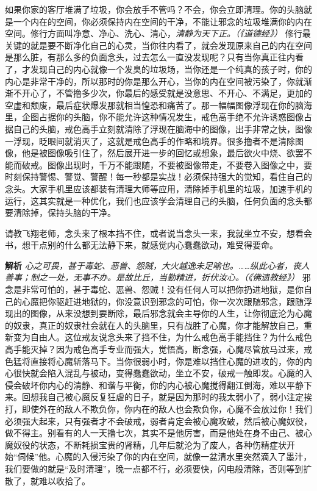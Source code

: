 如果你家的客厅堆满了垃圾，你会放手不管吗？不会，你会立即清理。你的头脑就是一个内在的空间，你必须保持内在空间的干净，不能让邪念的垃圾堆满你的内在空间。修行方面叫净意、净心、洗心、清心，\textit{清静为天下正。（《道德经》）} 修行最关键的就是要不断净化自己的心灵，当你往内看了，就会发现原来自己的内在空间是那么脏，有那么多的负面念头，过去怎么一直没发现呢？只有当你真正往内看了，才发现自己的内心就像一个发臭的垃圾场，当你还是一个纯真的孩子时，你的内心是非常干净的，所以那时的你是那么开心，当你的内在空间被污染了，你就渐渐不开心了，不管撸多少次，你最后的感受就是没意思、不开心、不满足，更加的空虚和颓废，最后症状爆发那就相当惶恐和痛苦了。那一幅幅图像浮现在你的脑海里，企图占据你的头脑，你不能允许这种情况发生，戒色高手绝不允许诱惑图像占据自己的头脑，戒色高手立刻就清除了浮现在脑海中的图像，出手非常之快，图像一浮现，眨眼间就消灭了，这就是戒色高手的作略和境界。很多撸者不是清除图像，他是被图像吸引住了，然后展开进一步的回忆或想象，最后欲火中烧、欲罢不能而破戒。图像出现时，千万不能跟随，不要被图像带走，不要卷入图像之中，要时刻保持警惕、警觉、警醒！每一秒都是实战！必须保持强大的觉知，看住自己的念头。大家手机里应该都装有清理大师等应用，清除掉手机里的垃圾，加速手机的运行，这其实就是一种优化，我们也应该学会清理自己的头脑，任何负面的念头都要清除掉，保持头脑的干净。

\begin{case}
    请教飞翔老师，念头来了根本挡不住，或者说当念头一来，我就坐立不安，想看会书，想干点别的什么都无法静下来，就感觉内心蠢蠢欲动，难受得要命。

    \textbf{解析} \textit{心之可畏，甚于毒蛇、恶兽、怨贼，大火越逸未足喻也。……纵此心者，丧人善事；制之一处，无事不办。是故比丘，当勤精进，折伏汝心。（《佛遗教经》）} 邪念是非常可怕的，甚于毒蛇、恶兽、怨贼！没有任何人可以把你扔进地狱，是你自己的心魔把你驱赶进地狱的，你没意识到邪念的可怕，你一次次跟随邪念，跟随浮现出的图像，从来没想到要断除，最后邪念就会主导你的人生，让你彻底沦为心魔的奴隶，真正的奴隶社会就在人的头脑里，只有战胜了心魔，你才能解放自己，重新变为自由人。这位戒友说念头来了挡不住，为什么戒色高手能挡住？为什么戒色高手能灭掉？因为戒色高手专业而强大，觉悟高，断念强，心魔尽管放马过来，戒色猛将直接将心魔斩落马下。当你很弱小时，你是难以挡住心魔的进攻的，你的内心很快就会陷入混乱与被动，变得蠢蠢欲动，坐立不安，破戒一触即发。心魔的入侵会破坏你内心的清静、和谐与平衡，你的内心被心魔搅得翻江倒海，难以平静下来。回想我自己被心魔反复狂虐的日子，就是因为那时的我太弱小了，弱小注定挨打，即使外在的敌人不欺负你，你内在的敌人也会欺负你，心魔不会放过你！我们必须强大起来，只有强者才不会破戒，弱者肯定会被心魔攻破，然后被心魔奴役，做不得主。别看有的人一天撸七次，其实不是他厉害，而是他处在身不由己、被心魔奴役的状态，不断耗损宝贵的肾精，几年后就沦为了废人，各种伤精症状开始“伺候”他。心魔的入侵污染了你的内在空间，就像一盆清水里突然滴入了墨汁，我们要做的就是“及时清理”，晚一点都不行，必须要快，闪电般清除，否则等到扩散了，就难以收拾了。
\end{case}


